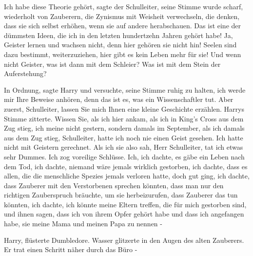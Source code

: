 \glqq{}Ich habe diese Theorie gehört\grqq{}, sagte der Schulleiter, seine Stimme
wurde scharf, \glqq{}wiederholt von Zauberern, die Zynismus mit Weisheit
verwechseln, die denken, dass sie sich selbst erhöhen, wenn sie auf andere
herabschauen. Das ist eine der dümmsten Ideen, die ich in den letzten
hundertzehn Jahren gehört habe! Ja, Geister lernen und wachsen nicht, denn hier
gehören sie nicht hin! Seelen sind dazu bestimmt, weiterzuziehen, hier gibt es
kein Leben mehr für sie! Und wenn nicht Geister, was ist dann mit dem Schleier?
Was ist mit dem Stein der Auferstehung?\grqq{}

\glqq{}In Ordnung\grqq{}, sagte Harry und versuchte, seine Stimme ruhig zu
halten, \glqq{}ich werde mir Ihre Beweise anhören, denn das ist es, was ein
Wissenschaftler tut. Aber zuerst, Schulleiter, lassen Sie mich Ihnen eine kleine
Geschichte erzählen.\grqq{} Harrys Stimme zitterte. \glqq{}Wissen Sie, als ich
hier ankam, als ich in King's Cross aus dem Zug stieg, ich meine nicht gestern,
sondern damals im September, als ich damals aus dem Zug stieg, Schulleiter,
hatte ich noch nie einen Geist gesehen. Ich hatte nicht mit Geistern gerechnet.
Als ich sie also sah, Herr Schulleiter, tat ich etwas sehr Dummes. Ich zog
voreilige Schlüsse. Ich, ich dachte, es gäbe ein Leben nach dem Tod, ich dachte,
niemand wäre jemals wirklich gestorben, ich dachte, dass es allen, die die
menschliche Spezies jemals verloren hatte, doch gut ging, ich dachte, dass
Zauberer mit den Verstorbenen sprechen könnten, dass man nur den richtigen
Zauberspruch bräuchte, um sie herbeizurufen, dass Zauberer das tun könnten, ich
dachte, ich könnte meine Eltern treffen, die für mich gestorben sind, und ihnen
sagen, dass ich von ihrem Opfer gehört habe und dass ich angefangen habe, sie
meine Mama und meinen Papa zu nennen -\grqq{}

\glqq{}Harry\grqq{}, flüsterte Dumbledore. Wasser glitzerte in den Augen des
alten Zauberers. Er trat einen Schritt näher durch das Büro -

